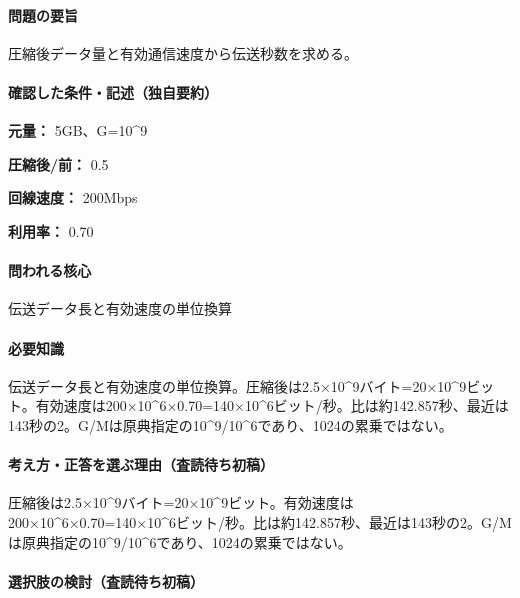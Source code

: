 \paragraph{問題の要旨} 圧縮後データ量と有効通信速度から伝送秒数を求める。

\paragraph{確認した条件・記述（独自要約）}\mbox{}\par

\noindent\textbf{元量：} 5GB、G=\allowbreak{}10\textasciicircum{}9\par

\noindent\textbf{圧縮後/前：} 0.5\par

\noindent\textbf{回線速度：} 200Mbps\par

\noindent\textbf{利用率：} 0.70\par

\paragraph{問われる核心} 伝送データ長と有効速度の単位換算

\paragraph{必要知識} 伝送データ長と有効速度の単位換算。圧縮後は2.5×10\textasciicircum{}9バイト=20×10\textasciicircum{}9ビット。有効速度は200×10\textasciicircum{}6×0.70=\allowbreak{}140×10\textasciicircum{}6ビット/秒。比は約142.857秒、最近は143秒の2。G/Mは原典指定の10\textasciicircum{}9/10\textasciicircum{}6であり、1024の累乗ではない。

\paragraph{考え方・正答を選ぶ理由（査読待ち初稿）} 圧縮後は2.5×10\textasciicircum{}9バイト=20×10\textasciicircum{}9ビット。有効速度は200×10\textasciicircum{}6×0.70=\allowbreak{}140×10\textasciicircum{}6ビット/秒。比は約142.857秒、最近は143秒の2。G/Mは原典指定の10\textasciicircum{}9/10\textasciicircum{}6であり、1024の累乗ではない。

\paragraph{選択肢の検討（査読待ち初稿）}\mbox{}\par

